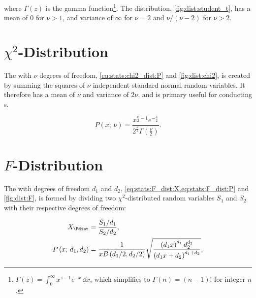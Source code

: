 \noindent where $\Gamma\left(z\right)$ is the gamma function\footnote{$\Gamma\left(z\right) = \int_{0}^{\infty} x^{z-1} e^{-x} \, \dd{x}$,
which simplifies to $\Gamma\left(n\right)=\left(n-1\right)!$ for integer $n$.}.
The distribution, \cref{fig:dist:student_t}, has a mean of \num{0} for $\nu > 1$,
and variance of $\infty$ for $\nu =2$ and $\nu / \left(\nu-2\right)$ for $\nu > 2$.

\section{\texorpdfstring{$\chi^{2}$-Distribution}{Chi-Squared Distribution}}
\label{stats:chi2_dist}

The \chiSqdist with $\nu$ degrees of freedom,
\cref{eq:stats:chi2_dist:P} and \cref{fig:dist:chi2},
is created by summing the squares of $\nu$ independent standard normal random variables.
It therefore has a mean of $\nu$ and variance of $2\nu$, and is
primary useful for conducting {\chiSqtest}s.

\begin{equation}\label{eq:stats:chi2_dist:P}
P\left(x;\,\nu\right) = \frac{
x^{\frac{\nu}{2} - 1} e^{-\frac{x}{2}}
}{
2^{\frac{\nu}{2}} \Gamma\left(\frac{\nu}{2}\right)}.
\end{equation}

\section{\texorpdfstring{$F$}{F}-Distribution}
\label{stats:F_dist}

The \Fdist with degrees of freedom $d_{1}$ and $d_{2}$,
\cref{eq:stats:F_dist:X,eq:stats:F_dist:P} and \cref{fig:dist:F},
is formed by dividing two $\chi^{2}$-distributed random variables
$S_{1}$ and $S_{2}$ with their respective degrees of freedom:

\begin{subequations}\label{eq:stats:F_dist}
\begin{align}
X_{\Fdist} &= \frac{S_{1}/d_{1}}{S_{2}/d_{2}}, \label{eq:stats:F_dist:X} \\
P\left(x;\,d_{1},d_{2}\right) &= \frac{1}{x B\left(d_{1}/2, d_{2}/2\right)} \sqrt{\frac{\left(d_{1} x\right)^{d_{1}} d_{2}^{d_{2}}}{\left(d_{1} x + d_{2}\right)^{d_{1}+d_{2}}}}, \label{eq:stats:F_dist:P}
\end{align}
\end{subequations}

